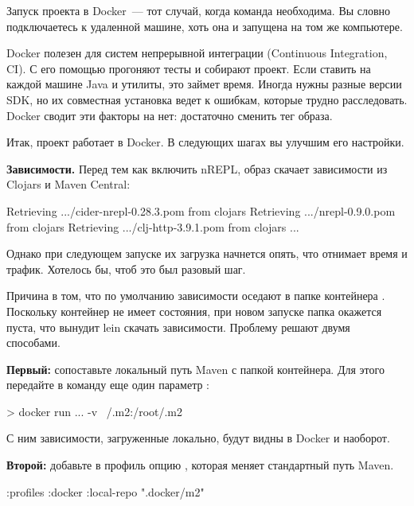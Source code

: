 Запуск проекта в Docker~--- тот случай, когда команда  необходима. Вы словно подключаетесь к удаленной машине, хоть она и запущена на том же компьютере.

Docker полезен для систем непрерывной интеграции (Continuous Integration, CI). С его помощью прогоняют тесты и собирают проект. Если ставить на каждой машине Java и утилиты, это займет время. Иногда нужны разные версии SDK, но их совместная установка ведет к ошибкам, которые трудно расследовать. Docker сводит эти факторы на нет: достаточно сменить тег образа.

Итак, проект работает в Docker. В следующих шагах вы улучшим его настройки.

\textbf{Зависимости.} Перед тем как включить nREPL, образ скачает зависимости из Clojars и Maven Central:

\begin{english}
  \begin{text}
Retrieving .../cider-nrepl-0.28.3.pom from clojars
Retrieving .../nrepl-0.9.0.pom from clojars
Retrieving .../clj-http-3.9.1.pom from clojars
...
  \end{text}
\end{english}

Однако при следующем запуске их загрузка начнется опять, что отнимает время и трафик. Хотелось бы, чтоб это был разовый шаг.

Причина в том, что по умолчанию зависимости оседают в папке контейнера . Поскольку контейнер не имеет состояния, при новом запуске папка окажется пуста, что вынудит lein скачать зависимости. Проблему решают двумя способами.

\textbf{Первый:} сопоставьте локальный путь Maven с папкой контейнера. Для этого передайте в команду  еще один параметр :

\begin{english}
  \begin{bash}
> docker run ... -v ~/.m2:/root/.m2
  \end{bash}
\end{english}

С ним зависимости, загруженные локально, будут видны в Docker и наоборот.

\textbf{Второй:} добавьте в профиль  опцию , которая меняет стандартный путь Maven.

\begin{english}
  \begin{clojure}
{:profiles
 {:docker {:local-repo ".docker/m2"}}}
  \end{clojure}
\end{english}

